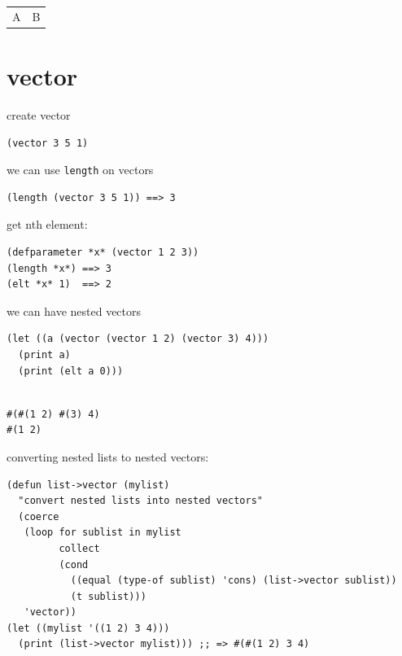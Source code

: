 \documentclass[a4paper,12pt]{article}
\begin{document}
\begin{tabular}{ll}
A & B\\
\end{tabular}

\section{vector}
\label{sec:org1734a31}
create vector\\
\lstset{language=Lisp,label= ,caption= ,captionpos=b,numbers=none}
\begin{lstlisting}
(vector 3 5 1)
\end{lstlisting}

we can use \texttt{length} on vectors\\
\lstset{language=Lisp,label= ,caption= ,captionpos=b,numbers=none}
\begin{lstlisting}
(length (vector 3 5 1)) ==> 3
\end{lstlisting}

get nth element:\\
\lstset{language=Lisp,label= ,caption= ,captionpos=b,numbers=none}
\begin{lstlisting}
(defparameter *x* (vector 1 2 3))
(length *x*) ==> 3
(elt *x* 1)  ==> 2
\end{lstlisting}

we can have nested vectors\\
\lstset{language=Lisp,label= ,caption= ,captionpos=b,numbers=none}
\begin{lstlisting}
(let ((a (vector (vector 1 2) (vector 3) 4)))
  (print a)
  (print (elt a 0)))
\end{lstlisting}

\begin{verbatim}

#(#(1 2) #(3) 4) 
#(1 2) 
\end{verbatim}


converting nested lists to nested vectors:\\
\lstset{language=Lisp,label= ,caption= ,captionpos=b,numbers=none}
\begin{lstlisting}
(defun list->vector (mylist)
  "convert nested lists into nested vectors"
  (coerce
   (loop for sublist in mylist
         collect
         (cond
           ((equal (type-of sublist) 'cons) (list->vector sublist))
           (t sublist)))
   'vector))
(let ((mylist '((1 2) 3 4)))
  (print (list->vector mylist))) ;; => #(#(1 2) 3 4) 
\end{lstlisting}
\end{document}
